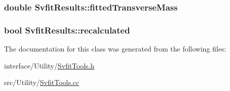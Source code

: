 \label{classSvfitResults_ad1b5371d1ebf4c5cc04c029f280a46cb}
\hypertarget{classSvfitResults_a0da3be281513b44ba678f0402b0bdf1d}{
\subsubsection[{fittedTransverseMass}]{\setlength{\rightskip}{0pt plus 5cm}double {\bf SvfitResults::fittedTransverseMass}}}
\label{classSvfitResults_a0da3be281513b44ba678f0402b0bdf1d}
\hypertarget{classSvfitResults_ad5d54373ccfdfb31d2a2c6006cd7c472}{
\subsubsection[{recalculated}]{\setlength{\rightskip}{0pt plus 5cm}bool {\bf SvfitResults::recalculated}}}
\label{classSvfitResults_ad5d54373ccfdfb31d2a2c6006cd7c472}


The documentation for this class was generated from the following files:\begin{DoxyCompactItemize}
\item 
interface/Utility/\hyperlink{SvfitTools_8h}{SvfitTools.h}\item 
src/Utility/\hyperlink{SvfitTools_8cc}{SvfitTools.cc}\end{DoxyCompactItemize}

